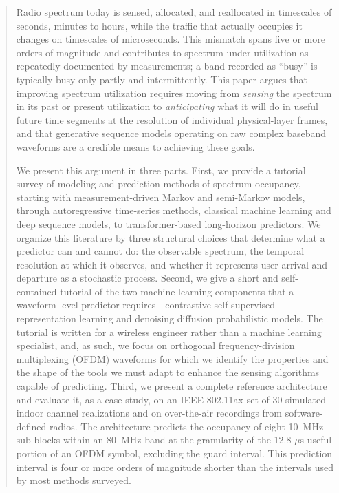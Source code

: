 \documentclass[lettersize,journal]{IEEEtran}
\begin{document}
\begin{abstract}
Radio spectrum today is sensed, allocated, and reallocated in timescales of
seconds, minutes to hours, while the traffic that actually occupies it changes on
timescales of microseconds. This mismatch spans five or more orders of
magnitude and contributes to spectrum under-utilization as repeatedly
documented by measurements; a band recorded as ``busy'' is
typically busy only partly and intermittently. This paper argues
that improving spectrum utilization requires moving from \emph{sensing}
the spectrum in its past or present utilization to \emph{anticipating} what it
will do in useful future time segments at the resolution of individual
physical-layer frames, and that generative sequence models operating on raw
complex baseband waveforms are a credible means to achieving these goals.

We present this argument in three parts. First, we provide a tutorial
survey of modeling and prediction methods of spectrum occupancy, starting
with measurement-driven Markov and semi-Markov models, through
autoregressive time-series methods, classical machine learning and deep
sequence models, to transformer-based long-horizon predictors. We
organize this literature by three structural choices that determine
what a predictor can and cannot do: the observable spectrum, the
temporal resolution at which it observes, and whether it represents user
arrival and departure as a stochastic process. Second, we give a
short and self-contained tutorial of the two machine learning
components that a waveform-level predictor requires---contrastive
self-supervised representation learning and denoising diffusion
probabilistic models. The tutorial is written for a wireless engineer
rather than a machine learning specialist, and, as such, we focus on
orthogonal frequency-division multiplexing (OFDM) waveforms for which we
identify the properties and the shape of the tools we must adapt to enhance the
sensing algorithms capable of predicting. Third, we present a complete
reference architecture and evaluate it, as a case study, on an IEEE 802.11ax
set of 30 simulated indoor channel realizations and on over-the-air
recordings from software-defined radios. The architecture predicts the
occupancy of eight 10~MHz sub-blocks within an 80~MHz band at the
granularity of the 12.8-$\mu$s useful portion of an OFDM symbol, excluding the guard interval. 
This prediction interval is four or more orders of magnitude shorter than 
the intervals used by most methods surveyed.


\end{abstract}
\end{document}
